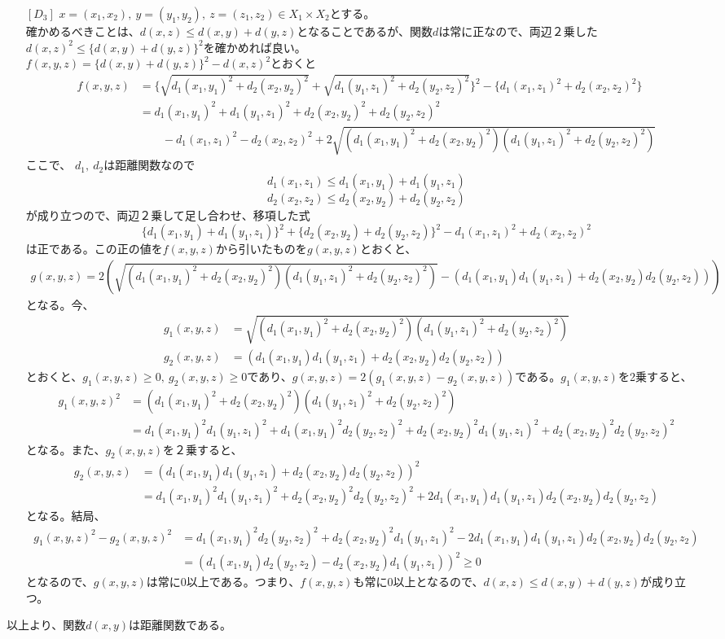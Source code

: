 \documentclass{jsarticle}
\begin{document}
\begin{enumerate}
\item[{$[D_3]$}]
$x=(x_1,x_2),\ y=(y_1,y_2),\ z=(z_1,z_2)\in X_1\times X_2$とする。\\
確かめるべきことは、$d(x,z)\leq d(x,y)+d(y,z)$となることであるが、関数$d$は常に正なので、両辺２乗した${d(x,z)}^2\leq \{d(x,y)+d(y,z)\}^2$を確かめれば良い。\\
$f(x,y,z)=\{d(x,y)+d(y,z)\}^2-{d(x,z)}^2$とおくと
\begin{align*}
f(x,y,z)&=\{\sqrt{{d_1(x_1,y_1)}^2+{d_2(x_2,y_2)}^2}+\sqrt{{d_1(y_1,z_1)}^2+{d_2(y_2,z_2)}^2}\}^2-\{{d_1(x_1,z_1)}^2+{d_2(x_2,z_2)}^2\}\\
&={d_1(x_1,y_1)}^2+{d_1(y_1,z_1)}^2+{d_2(x_2,y_2)}^2+{d_2(y_2,z_2)}^2\\
&\qquad-{d_1(x_1,z_1)}^2-{d_2(x_2,z_2)}^2+2\sqrt{({d_1(x_1,y_1)}^2+{d_2(x_2,y_2)}^2)({d_1(y_1,z_1)}^2+{d_2(y_2,z_2)}^2)}
\end{align*}
ここで、
$d_1,\ d_2$は距離関数なので
\[d_1(x_1,z_1)\leq d_1(x_1,y_1)+d_1(y_1,z_1)\]
\[d_2(x_2,z_2)\leq d_2(x_2,y_2)+d_2(y_2,z_2)\]
が成り立つので、両辺２乗して足し合わせ、移項した式
\[\{d_1(x_1,y_1)+d_1(y_1,z_1)\}^2+\{d_2(x_2,y_2)+d_2(y_2,z_2)\}^2-{d_1(x_1,z_1)}^2+{d_2(x_2,z_2)}^2\]
は正である。この正の値を$f(x,y,z)$から引いたものを$g(x,y,z)$とおくと、
\begin{align*}
g(x,y,z)=2(\sqrt{({d_1(x_1,y_1)}^2+{d_2(x_2,y_2)}^2)({d_1(y_1,z_1)}^2+{d_2(y_2,z_2)}^2)}-(d_1(x_1,y_1)d_1(y_1,z_1)+d_2(x_2,y_2)d_2(y_2,z_2)))
\end{align*}
となる。今、
\begin{align*}
g_1(x,y,z)&=\sqrt{({d_1(x_1,y_1)}^2+{d_2(x_2,y_2)}^2)({d_1(y_1,z_1)}^2+{d_2(y_2,z_2)}^2)}\\
g_2(x,y,z)&=(d_1(x_1,y_1)d_1(y_1,z_1)+d_2(x_2,y_2)d_2(y_2,z_2))
\end{align*}
とおくと、$g_1(x,y,z)\geq0,\ g_2(x,y,z)\geq0$であり、$g(x,y,z)=2(g_1(x,y,z)-g_2(x,y,z))$である。$g_1(x,y,z)$を2乗すると、
\begin{align*}
{g_1(x,y,z)}^2&=({d_1(x_1,y_1)}^2+{d_2(x_2,y_2)}^2)({d_1(y_1,z_1)}^2+{d_2(y_2,z_2)}^2)\\
&={d_1(x_1,y_1)}^2{d_1(y_1,z_1)}^2+{d_1(x_1,y_1)}^2{d_2(y_2,z_2)}^2+{d_2(x_2,y_2)}^2{d_1(y_1,z_1)}^2+{d_2(x_2,y_2)}^2{d_2(y_2,z_2)}^2
\end{align*}
となる。また、$g_2(x,y,z)$を２乗すると、
\begin{align*}
g_2(x,y,z)&={(d_1(x_1,y_1)d_1(y_1,z_1)+d_2(x_2,y_2)d_2(y_2,z_2))}^2\\
&={d_1(x_1,y_1)}^2{d_1(y_1,z_1)}^2+{d_2(x_2,y_2)}^2{d_2(y_2,z_2)}^2+2d_1(x_1,y_1)d_1(y_1,z_1)d_2(x_2,y_2)d_2(y_2,z_2)
\end{align*}
となる。結局、
\begin{align*}
{g_1(x,y,z)}^2-{g_2(x,y,z)}^2&={d_1(x_1,y_1)}^2{d_2(y_2,z_2)}^2+{d_2(x_2,y_2)}^2{d_1(y_1,z_1)}^2-2d_1(x_1,y_1)d_1(y_1,z_1)d_2(x_2,y_2)d_2(y_2,z_2)\\
&=(d_1(x_1,y_1)d_2(y_2,z_2)-d_2(x_2,y_2)d_1(y_1,z_1))^2\geq 0
\end{align*}
となるので、$g(x,y,z)$は常に0以上である。つまり、$f(x,y,z)$も常に0以上となるので、$d(x,z)\leq d(x,y)+d(y,z)$が成り立つ。
\end{enumerate}
以上より、関数$d(x,y)$は距離関数である。
\end{document}

